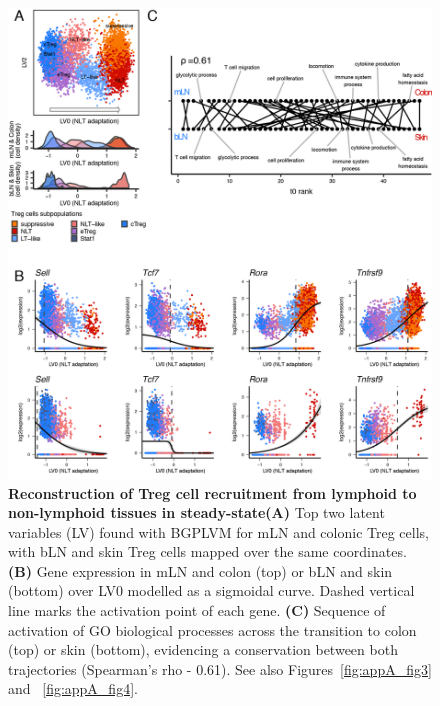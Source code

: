 \begin{figure}[pt] 
\centering    
\includegraphics[width=1.0\textwidth]{Chapter2/Figs/chap2_fig3.png} %
\caption[Reconstruction of Treg cell recruitment from lymphoid to non-lymphoid tissues in steady-state]{\textbf{Reconstruction of Treg cell recruitment from lymphoid to non-lymphoid tissues in steady-state}\newline\textbf{(A)} Top two latent variables (LV) found with BGPLVM for mLN and colonic Treg cells, with bLN and skin Treg cells mapped over the same coordinates. \textbf{(B)} Gene expression in mLN and colon (top) or bLN and skin (bottom) over LV0 modelled as a sigmoidal curve. Dashed vertical line marks the activation point of each gene. \textbf{(C)} Sequence of activation of GO biological processes across the transition to colon (top) or skin (bottom), evidencing a conservation between both trajectories (Spearman’s rho - 0.61). See also Figures~\ref{fig:appA_fig3} and ~\ref{fig:appA_fig4}.}
\label{fig:chap2_fig3}
\end{figure}

